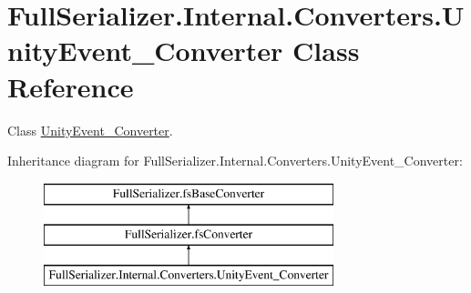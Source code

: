 \hypertarget{class_full_serializer_1_1_internal_1_1_converters_1_1_unity_event___converter}{}\section{Full\+Serializer.\+Internal.\+Converters.\+Unity\+Event\+\_\+\+Converter Class Reference}
\label{class_full_serializer_1_1_internal_1_1_converters_1_1_unity_event___converter}


Class \hyperlink{class_full_serializer_1_1_internal_1_1_converters_1_1_unity_event___converter}{Unity\+Event\+\_\+\+Converter}.  


Inheritance diagram for Full\+Serializer.\+Internal.\+Converters.\+Unity\+Event\+\_\+\+Converter\+:\begin{figure}[H]
\begin{center}
\leavevmode
\includegraphics[height=3.000000cm]{class_full_serializer_1_1_internal_1_1_converters_1_1_unity_event___converter}
\end{center}
\end{figure}
